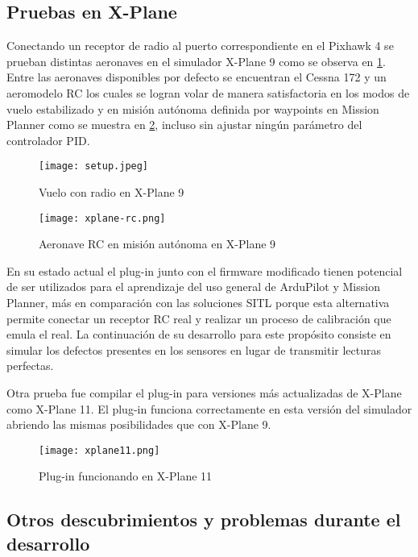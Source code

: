 \subsection{Pruebas en X-Plane}

Conectando un receptor de radio al puerto correspondiente en el Pixhawk 4 se prueban distintas aeronaves en el simulador X-Plane 9 como se observa en \cref{fig:setup}. Entre las aeronaves disponibles por defecto se encuentran el Cessna 172 y un aeromodelo RC los cuales se logran volar de manera satisfactoria en los modos de vuelo estabilizado y en misión autónoma definida por waypoints en Mission Planner como se muestra en \cref{fig:xplane-rc}, incluso sin ajustar ningún parámetro del controlador PID.

\begin{figure}[h]
    \centering
    \texttt{[image: setup.jpeg]}
    \caption{Vuelo con radio en X-Plane 9}
    \label{fig:setup}
\end{figure}

\begin{figure}[h]
    \centering
    \texttt{[image: xplane-rc.png]}
    \caption{Aeronave RC en misión autónoma en X-Plane 9}
    \label{fig:xplane-rc}
\end{figure}

En su estado actual el plug-in junto con el firmware modificado tienen potencial de ser utilizados para el aprendizaje del uso general de ArduPilot y Mission Planner, más en comparación con las soluciones SITL porque esta alternativa permite conectar un receptor RC real y realizar un proceso de calibración que emula el real. La continuación de su desarrollo para este propósito consiste en simular los defectos presentes en los sensores en lugar de transmitir lecturas perfectas.

Otra prueba fue compilar el plug-in para versiones más actualizadas de X-Plane como X-Plane 11. El plug-in funciona correctamente en esta versión del simulador abriendo las mismas posibilidades que con X-Plane 9.

\begin{figure}[h]
    \centering
    \texttt{[image: xplane11.png]}
    \caption{Plug-in funcionando en X-Plane 11}
    \label{fig:xplane11}
\end{figure}

\subsection{Otros descubrimientos y problemas durante el desarrollo}

